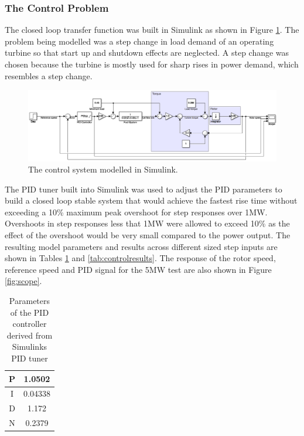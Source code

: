  \begin{landscape}
\subsubsection{The Control Problem}
The closed loop transfer function was built in Simulink as shown in Figure \ref{fig:controlsimulink}. The problem being modelled was a step change in load demand of an operating turbine so that start up and shutdown effects are neglected. A step change was chosen because the turbine is mostly used for sharp rises in power demand, which resembles a step change. 
\begin{figure} [h]
\centering
\includegraphics[width=1\textwidth]{./pictures/controlsimulink.png}
 \caption{The control system modelled in Simulink.} \label{fig:controlsimulink} 
 \end{figure}
 The PID tuner built into Simulink was used to adjust the PID parameters to build a closed loop stable system that would achieve the fastest rise time without exceeding a 10\% maximum peak overshoot for step responses over 1MW. Overshoots in step responses less that 1MW were allowed to exceed 10\% as the effect of the overshoot would be very small compared to the power output. The resulting model parameters and results across different sized step inputs are shown in Tables \ref{tab:PID} and \ref{tab:controlresults}. The response of the rotor speed, reference speed and PID signal for the 5MW test are also shown in Figure \ref{fig:scope}. 
 \end{landscape}

 \begin {table} [h]
\begin{center}
\caption{Parameters of the PID controller derived from Simulinks PID tuner} \label{tab:PID} 
\begin{tabular}{ |c|c| }
 \hline
  P & 1.0502\\ 
 \hline
  I & 0.04338\\ 
  \hline
  D & 1.172\\ 
 \hline
 N & 0.2379\\
 \hline
\end{tabular}
\end{center}  
\end {table}


